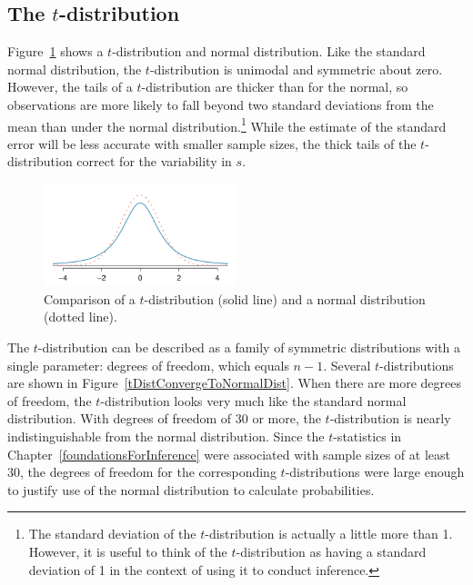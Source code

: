 \subsection{The $t$-distribution}
\label{introducingTheTDistribution}


Figure~\ref{tDistCompareToNormalDist} shows a $t$-distribution and normal distribution. Like the standard normal distribution, the $t$-distribution is unimodal and symmetric about zero.  However, the tails of a $t$-distribution are thicker than for the normal, so observations are more likely to fall beyond two standard deviations from the mean than under the normal distribution.\footnote{The standard deviation of the $t$-distribution is actually a little more than 1. However, it is useful to think of the $t$-distribution as having a standard deviation of 1 in the context of using it to conduct inference.} While the estimate of the standard error will be less accurate with smaller sample sizes, the thick tails of the $t$-distribution correct for the variability in $s$.

\begin{figure}[h]
\centering
\includegraphics[width=0.5\textwidth]{ch_inference_for_means_oi_biostat/figures/tDistCompareToNormalDist/tDistCompareToNormalDist}
\caption{Comparison of a $t$-distribution (solid line) and a normal distribution (dotted line).}
\label{tDistCompareToNormalDist}
\end{figure}

The $t$-distribution can be described as a family of symmetric distributions with a single parameter: degrees of freedom, which equals $n - 1$. Several $t$-distributions are shown in Figure~\ref{tDistConvergeToNormalDist}. When there are more degrees of freedom, the $t$-distribution looks very much like the standard normal distribution. With degrees of freedom of 30 or more, the $t$-distribution is nearly indistinguishable from the normal distribution. Since the $t$-statistics in Chapter~\ref{foundationsForInference} were associated with sample sizes of at least 30, the degrees of freedom for the corresponding $t$-distributions were large enough to justify use of the normal distribution to calculate probabilities.

